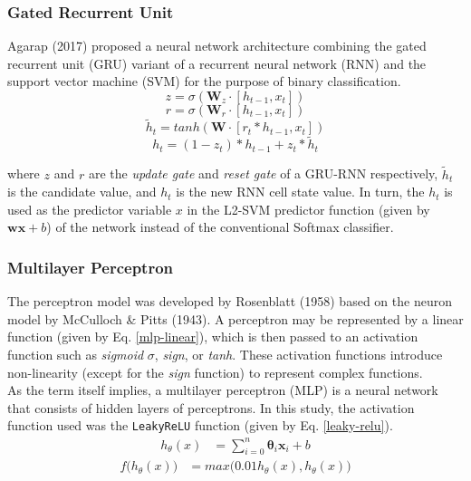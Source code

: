 \documentclass[sigconf]{acmart}
\renewcommand{\vec}[1]{\mathbf{#1}}
\begin{document}
\subsubsection{Gated Recurrent Unit}\label{gru}
Agarap (2017)\cite{agarap2017neural} proposed a neural network architecture combining the gated recurrent unit (GRU)\cite{Cho} variant of a recurrent neural network (RNN) and the support vector machine (SVM)\cite{Cortes} for the purpose of binary classification.
\begin{equation}\label{z-gate}
z	=	\sigma(\vec{W}_{z} \cdot [h_{t - 1}, x_{t}])
\end{equation}
\begin{equation}\label{r-gate}
r	=	\sigma(\vec{W}_{r} \cdot [h_{t - 1}, x_{t}])
\end{equation}
\begin{equation}\label{candidate-value}
\tilde{h}_{t}	=	tanh(\vec{W} \cdot [r_{t} * h_{t - 1}, x_{t}])
\end{equation}
\begin{equation}\label{new-value}
h_{t}	=	(1 - z_{t}) * h_{t - 1} + z_{t} * \tilde{h}_{t}
\end{equation}

where $z$ and $r$ are the \textit{update gate} and \textit{reset gate} of a GRU-RNN respectively, $\tilde{h}_{t}$ is the candidate value, and $h_{t}$ is the new RNN cell state value\cite{Cho}. In turn, the $h_{t}$ is used as the predictor variable $x$ in the L2-SVM predictor function (given by $\vec{w}\vec{x} + b$) of the network instead of the conventional Softmax classifier.

\subsubsection{Multilayer Perceptron}\label{mlp}
The perceptron model was developed by Rosenblatt (1958)\cite{rosenblatt1958perceptron} based on the neuron model by McCulloch \& Pitts (1943)\cite{mcculloch1943logical}. A perceptron may be represented by a linear function (given by Eq. \ref{mlp-linear}), which is then passed to an activation function such as \textit{sigmoid} $\sigma$, \textit{sign}, or \textit{tanh}. These activation functions introduce non-linearity (except for the \textit{sign} function) to represent complex functions.\\
\indent	As the term itself implies, a multilayer perceptron (MLP) is a neural network that consists of hidden layers of perceptrons. In this study, the activation function used was the \texttt{LeakyReLU}\cite{maas2013rectifier} function (given by Eq. \ref{leaky-relu}).
\begin{align}\label{mlp-linear}
h_{\theta}(x)	&=	\sum_{i = 0}^{n} \vec{\theta}_{i} \vec{x}_{i} + b
\end{align}
\begin{align}\label{leaky-relu}
f\big(h_{\theta}(x)\big)	&=	max\big(0.01h_{\theta}(x), h_{\theta}(x)\big)
\end{align}
\end{document}

